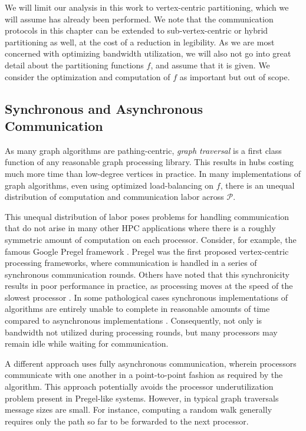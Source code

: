 \documentclass[10]{report}
\begin{document}
We will limit our analysis in this work to vertex-centric partitioning, which we will assume has already been performed. 
We note that the communication protocols in this chapter can be extended to sub-vertex-centric or hybrid partitioning as well, at the cost of a reduction in legibility. 
As we are most concerned with optimizing bandwidth utilization, we will also not go into great detail about the partitioning functions $f$, and assume that it is given.
We consider the optimization and computation of $f$ as important but out of scope. 


\subsection{Synchronous and Asynchronous Communication} \label{async:sec:intro:communication}


As many graph algorithms are pathing-centric, \emph{graph traversal} is a first class function of any reasonable graph processing library.
This results in hubs costing much more time than low-degree vertices in practice.
In many implementations of graph algorithms, even using optimized load-balancing on $f$, there is an unequal distribution of computation and communication labor across $\mathcal{P}$.

This unequal distribution of labor poses problems for handling communication that do not arise in many other HPC applications where there is a roughly symmetric amount of computation on each processor. 
Consider, for example, the famous Google Pregel framework \cite{malewicz2010pregel}.
Pregel was the first proposed vertex-centric processing frameworks, where communication is handled in a series of synchronous communication rounds.
Others have noted that this synchronicity results in poor performance in practice, as processing moves at the speed of the slowest processor \cite{pearce2014faster, junghanns2017management}.
In some pathological cases synchronous implementations of algorithms are entirely unable to complete in reasonable amounts of time compared to asynchronous implementations \cite{junghanns2017management}.
Consequently, not only is bandwidth not utilized during processing rounds, but many processors may remain idle while waiting for communication.

A different approach uses fully asynchronous communication, wherein processors communicate with one another in a point-to-point fashion as required by the algorithm.
This approach potentially avoids the processor underutilization problem present in Pregel-like systems.
However, in typical graph traversals message sizes are small.
For instance, computing a random walk generally requires only the path so far to be forwarded to the next processor.
\end{document}
